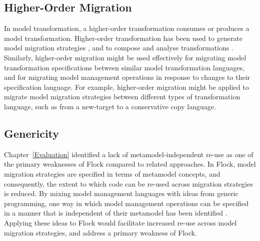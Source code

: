 \subsection{Higher-Order Migration}
In model transformation, a higher-order transformation consumes or produces a model transformation. Higher-order transformation has been used to generate model migration strategies \cite{cicchetti08thesis,garces09managing}, and to compose and analyse transformations \cite{tisi09hot}. Similarly, higher-order migration might be used effectively for migrating model transformation specifications between similar model transformation languages, and for migrating model management operations in response to changes to their specification language. For example, higher-order migration might be applied to migrate model migration strategies between different types of transformation language, such as from a new-target to a conservative copy language.


\subsection{Genericity}
Chapter~\ref{Evaluation} identified a lack of metamodel-independent re-use as one of the primary weaknesses of Flock compared to related approaches. In Flock, model migration strategies are specified in terms of metamodel concepts, and consequently, the extent to which code can be re-used across migration strategies is reduced. By \cc mixing model management languages with ideas from generic programming, one way in which model management operations can be specified in a manner that is independent of their metamodel has been identified \cite{delara10generic}. Applying these ideas to Flock would facilitate increased re-use across model migration strategies, and address a primary weakness of Flock. 
